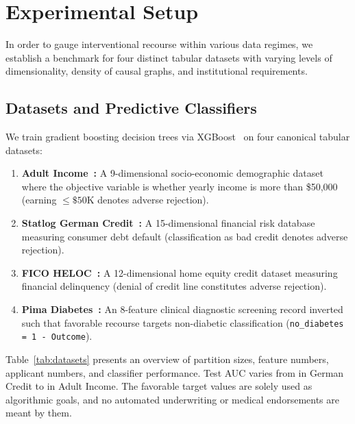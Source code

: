 \documentclass[nolineno]{paper/ieee-access/ieeeaccess}%
\newcommand{\artifact}[1]{\nolinkurl{#1}}
\begin{document}
\section{Experimental Setup}
\label{sec:protocol}
In order to gauge interventional recourse within various data regimes, we establish a benchmark for four distinct tabular datasets with varying levels of dimensionality, density of causal graphs, and institutional requirements.

\subsection{Datasets and Predictive Classifiers}
We train gradient boosting decision trees via XGBoost~\cite{chen2016xgboost} on four canonical tabular datasets:
\begin{enumerate}
\item \textbf{Adult Income~\cite{kohavi1996adult, dua2019uci}:} A 9-dimensional socio-economic demographic dataset where the objective variable is whether yearly income is more than \$50,000 (earning $\le \$50\mathrm{K}$ denotes adverse rejection).
\item \textbf{Statlog German Credit~\cite{dua2019uci}:} A 15-dimensional financial risk database measuring consumer debt default (classification as bad credit denotes adverse rejection).
\item \textbf{FICO HELOC~\cite{fico2018heloc}:} A 12-dimensional home equity credit dataset measuring financial delinquency (denial of credit line constitutes adverse rejection).
\item \textbf{Pima Diabetes~\cite{smith1988diabetes}:} An 8-feature clinical diagnostic screening record inverted such that favorable recourse targets non-diabetic classification (\artifact{no_diabetes = 1 - Outcome}).
\end{enumerate}

\begin{table}[t]
\caption{Benchmark datasets and predictive classification models. Dimensionality $d$ indicates features after preprocessing; queries indicate evaluated rejected test individuals; AUC is reported on the held-out test split.}
\label{tab:datasets}
\centering\small

\end{table}

Table~\ref{tab:datasets} presents an overview of partition sizes, feature numbers, applicant numbers, and classifier performance. Test AUC varies from \GermanAuc{} in German Credit to \AdultAuc{} in Adult Income. The favorable target values are solely used as algorithmic goals, and no automated underwriting or medical endorsements are meant by them.
\end{document}
